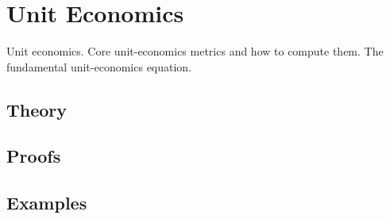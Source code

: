 
\section{Unit Economics}
\label{sec:2.6.18-unit-economics}

\begin{ticket}
Unit economics. Core unit-economics metrics and how to compute them. The fundamental unit-economics equation.
\end{ticket}

\subsection*{Theory}

\subsection*{Proofs}

\subsection*{Examples}
